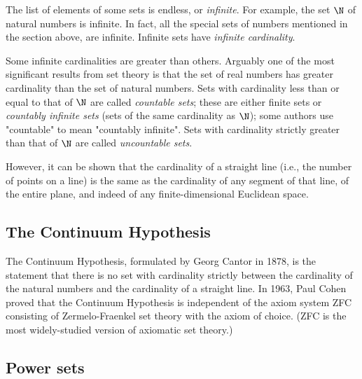 The list of elements of some sets is endless, or \textit{infinite}. For example, the set
$\N$ of natural numbers is infinite. In fact, all the special sets of numbers mentioned in
the section above, are infinite. Infinite sets have \textit{infinite cardinality}.



Some infinite cardinalities are greater than others. Arguably one of the most significant
results from set theory is that the set of real numbers has greater cardinality than the
set of natural numbers. Sets with cardinality less than or equal to that of $\N$ are
called \textit{countable sets}; these are either finite sets or \textit{countably infinite
sets} (sets of the same cardinality as $\N$); some authors use "countable" to mean
"countably infinite". Sets with cardinality strictly greater than that of $\N$ are called
\textit{uncountable sets}.



However, it can be shown that the cardinality of a straight line (i.e., the number of
points on a line) is the same as the cardinality of any segment of that line, of the
entire plane, and indeed of any finite-dimensional Euclidean space.




\subsection{The Continuum Hypothesis}
\label{sss:thec-fb13}




The Continuum Hypothesis, formulated by Georg Cantor in 1878, is the statement that there
is no set with cardinality strictly between the cardinality of the natural numbers and the
cardinality of a straight line. In 1963, Paul Cohen proved that the Continuum Hypothesis
is independent of the axiom system ZFC consisting of Zermelo-Fraenkel set theory with the
axiom of choice. (ZFC is the most widely-studied version of axiomatic set theory.)




\subsection{Power sets}
\label{sss:powe-2e43}




